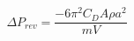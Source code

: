 \begin{equation*}
\Delta P_{rev} = \frac{-6 \pi^{2} C_{D}A \rho a^{2}}{mV} \tag{4.54}
\end{equation*}
